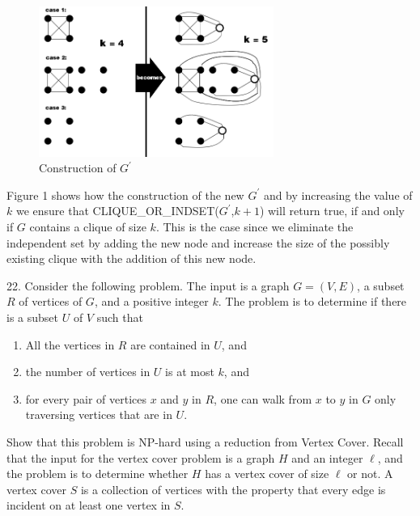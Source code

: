 \documentclass[10pt]{article}
\begin{document}
		\begin{figure}[h]
		\centering
		\includegraphics[width=290px]{cliqueoris.png}
		\caption{Construction of $G^\prime$}
		\end{figure}
		
	Figure 1 shows how the construction of the new $G^\prime$ and by increasing the value of $k$ we ensure that
	CLIQUE\_OR\_INDSET($G^\prime$,$k + 1$) will return true, if and only if $G$ contains a clique of size $k$. 
	This is the case since we eliminate the independent set by adding the new node and increase the size of the 
	possibly existing clique with the addition of this new node.
	
	\newpage


	22. Consider the following problem. The input is a graph $G = (V, E)$, a subset $R$ of vertices of $G$, and a
	positive integer $k$. The problem is to determine if there is a subset $U$ of $V$ such that
	\begin{enumerate}
		\item All the vertices in $R$ are contained in $U$, and
		\item the number of vertices in $U$ is at most $k$, and
		\item for every pair of vertices $x$ and $y$ in $R$, one can walk from $x$ to $y$ in $G$ only traversing vertices that
		are in $U$.
	\end{enumerate}
	Show that this problem is NP-hard using a reduction from Vertex Cover. Recall that the input for the
	vertex cover problem is a graph $H$ and an integer $\ell$, and the problem is to determine whether $H$ has a
	vertex cover of size $\ell$ or not. A vertex cover $S$ is a collection of vertices with the property that every
	edge is incident on at least one vertex in $S$.

	\newpage
\end{document}
